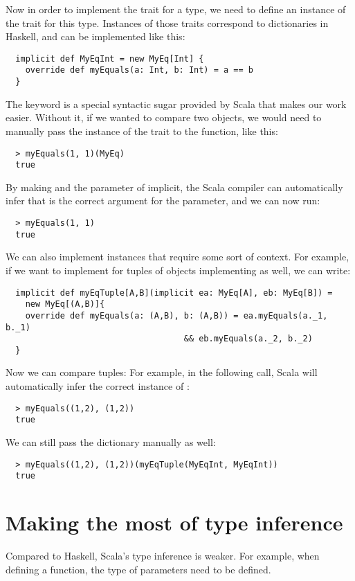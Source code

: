 Now in order to implement the trait for a type, we need to define an instance
of the trait for this type. Instances of those traits correspond to dictionaries
in Haskell, and can be implemented like this:
\begin{lstlisting}
  implicit def MyEqInt = new MyEq[Int] {
    override def myEquals(a: Int, b: Int) = a == b
  }
\end{lstlisting}
The  keyword is a special syntactic sugar provided by Scala
that makes our work easier. Without it, if we wanted to compare two objects,
we would need to manually pass the instance of the trait to the function,
like this:
\begin{lstlisting}
  > myEquals(1, 1)(MyEq)
  true
\end{lstlisting}
By making  and the  parameter of  implicit,
the Scala compiler can automatically infer that  is the
correct argument for the  parameter, and we can now run:
\begin{lstlisting}
  > myEquals(1, 1)
  true
\end{lstlisting}
We can also implement instances that require some sort of context. For
example, if we want to implement  for tuples of objects implementing
 as well, we can write:
\begin{lstlisting}
  implicit def myEqTuple[A,B](implicit ea: MyEq[A], eb: MyEq[B]) =
    new MyEq[(A,B)]{
    override def myEquals(a: (A,B), b: (A,B)) = ea.myEquals(a._1, b._1)
                                    && eb.myEquals(a._2, b._2)
  }
\end{lstlisting}
Now we can compare tuples: For example, in the following call, Scala will
automatically infer the correct instance of :
\begin{lstlisting}
  > myEquals((1,2), (1,2))
  true
\end{lstlisting}
We can still pass the dictionary manually as well:
\begin{lstlisting}
  > myEquals((1,2), (1,2))(myEqTuple(MyEqInt, MyEqInt))
  true
\end{lstlisting}

\section{Making the most of type inference}
\label{type-inference}

Compared to Haskell, Scala's type inference is weaker. For example, when
defining a function, the type of parameters need to be defined.

